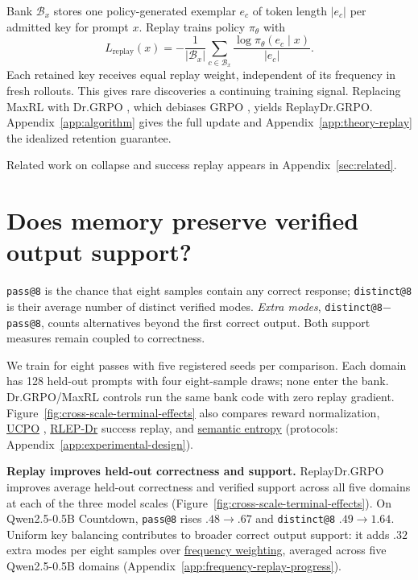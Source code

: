 Bank $\mathcal B_x$ stores one policy-generated exemplar $e_c$ of token length
$|e_c|$ per admitted key for prompt $x$. Replay trains policy $\pi_\theta$ with
\begin{equation}
L_{\mathrm{replay}}(x)=-\frac{1}{|\mathcal B_x|}
\sum_{c\in\mathcal B_x}\frac{\log\pi_\theta(e_c\mid x)}{|e_c|}.
\label{eq:lm-verified-replay}
\end{equation}
Each retained key receives equal replay weight, independent of its frequency
in fresh rollouts. This gives rare discoveries a continuing training signal.
Replacing MaxRL with Dr.GRPO \citep{liu2025understanding},
which debiases GRPO \citep{shao2024deepseekmath}, yields ReplayDr.GRPO.
Appendix~\ref{app:algorithm} gives the full update and
Appendix~\ref{app:theory-replay} the idealized retention guarantee.

Related work on collapse \citep{cui2025entropy,dang2025diversity} and success
replay \citep{zhang2025rlep} appears in Appendix~\ref{sec:related}.

\section{Does memory preserve verified output support?}
\label{sec:experiments}\label{sec:results}
\texttt{pass@8} is the chance that eight samples contain any correct response;
\texttt{distinct@8} is their average number of distinct verified modes.
\emph{Extra modes}, \texttt{distinct@8}$-$\texttt{pass@8}, counts alternatives
beyond the first correct output. Both support measures remain coupled to correctness.

We train for eight passes with five registered seeds per comparison. Each domain
has 128 held-out prompts with four eight-sample draws; none enter the bank.
Dr.GRPO/MaxRL controls run the same bank code with zero replay gradient.
Figure~\ref{fig:cross-scale-terminal-effects} also compares reward normalization,
\href{https://huggingface.co/od2961/maxent-grpo-models/blob/main/EXPERIMENTS.md\#direct-comparators}{UCPO} \citep{lochab2026ucpo}, \href{https://huggingface.co/od2961/maxent-grpo-models/blob/main/EXPERIMENTS.md\#direct-comparators}{RLEP-Dr} success replay, and \href{https://huggingface.co/od2961/maxent-grpo-models/blob/main/EXPERIMENTS.md\#semantic-ablations}{semantic entropy}
(protocols: Appendix~\ref{app:experimental-design}).



\noindent\textbf{Replay improves held-out correctness and support.}
\label{sec:results-retention}
ReplayDr.GRPO improves average held-out correctness and verified support across
all five domains at each of the three model scales
(Figure~\ref{fig:cross-scale-terminal-effects}).
On Qwen2.5-0.5B Countdown, \texttt{pass@8} rises $.48\to.67$ and
\texttt{distinct@8} $.49\to1.64$. Uniform key balancing contributes to broader correct output support:
it adds $.32$ extra modes per eight samples over \href{https://huggingface.co/od2961/maxent-grpo-models/blob/main/experiments/E120-R1/README.md\#models}{frequency weighting},
averaged across five Qwen2.5-0.5B domains
(Appendix~\ref{app:frequency-replay-progress}).

